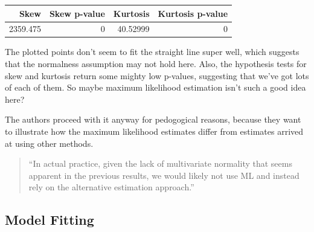 \documentclass[
  letterpaper,
  DIV=11,
  numbers=noendperiod]{scrreprt}
\newenvironment{Shaded}{\begin{snugshade}}{\end{snugshade}}
\newcommand{\CommentTok}[1]{\textcolor[rgb]{0.37,0.37,0.37}{#1}}
\newcommand{\FunctionTok}[1]{\textcolor[rgb]{0.28,0.35,0.67}{#1}}
\newcommand{\NormalTok}[1]{\textcolor[rgb]{0.00,0.23,0.31}{#1}}
\newcommand{\OtherTok}[1]{\textcolor[rgb]{0.00,0.23,0.31}{#1}}
\newcommand{\SpecialCharTok}[1]{\textcolor[rgb]{0.37,0.37,0.37}{#1}}
\newcommand{\StringTok}[1]{\textcolor[rgb]{0.13,0.47,0.30}{#1}}
\begin{document}
\begin{Shaded}
\end{Shaded}

\begin{longtable}[]{@{}rrrr@{}}
\toprule()
Skew & Skew p-value & Kurtosis & Kurtosis p-value \\
\midrule()
\endhead
2359.475 & 0 & 40.52999 & 0 \\
\bottomrule()
\end{longtable}

The plotted points don't seem to fit the straight line super well, which
suggests that the normalness assumption may not hold here. Also, the
hypothesis tests for skew and kurtosis return some mighty low p-values,
suggesting that we've got lots of each of them. So maybe maximum
likelihood estimation isn't such a good idea here?

The authors proceed with it anyway for pedogogical reasons, because they
want to illustrate how the maximum likelihood estimates differ from
estimates arrived at using other methods.

\begin{quote}
``In actual practice, given the lack of multivariate normality that
seems apparent in the previous results, we would likely not use ML and
instead rely on the alternative estimation approach.''
\end{quote}

\hypertarget{model-fitting}{%
\subsection*{Model Fitting}\label{model-fitting}}
\end{document}

